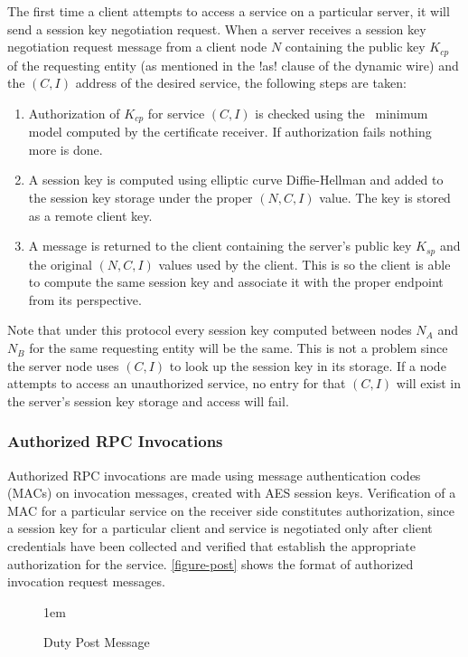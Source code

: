 The first time a client attempts to access a service on a particular server, it will send a
session key negotiation request. When a server receives a session key negotiation request
message from a client node $N$ containing the public key $K_{cp}$ of the requesting entity (as
mentioned in the !as! clause of the dynamic wire) and the $(C, I)$ address of the desired
service, the following steps are taken:
\begin{enumerate}
\item Authorization of $K_{cp}$ for service $(C, I)$ is checked using the \RT\ minimum model
  computed by the certificate receiver. If authorization fails nothing more is done.
\item A session key is computed using elliptic curve Diffie-Hellman and added to the session key
  storage under the proper $(N, C, I)$ value. The key is stored as a remote client key.
\item A message is returned to the client containing the server's public key $K_{sp}$ and the
  original $(N, C, I)$ values used by the client. This is so the client is able to compute the
  same session key and associate it with the proper endpoint from its perspective.
\end{enumerate}

Note that under this protocol every session key computed between nodes $N_A$ and $N_B$ for the
same requesting entity will be the same. This is not a problem since the server node uses $(C,
I)$ to look up the session key in its storage. If a node attempts to access an unauthorized
service, no entry for that $(C, I)$ will exist in the server's session key storage and access
will fail.

\subsubsection{Authorized RPC Invocations}

Authorized RPC invocations are made using message authentication codes (MACs) on invocation
messages, created with AES session keys. Verification of a MAC for a particular service on the
receiver side constitutes authorization, since a session key for a particular client and service
is negotiated only after client credentials have been collected and verified that establish the
appropriate authorization for the service. \autoref{figure-post} shows the format of authorized
invocation request messages.

\begin{figure}[t]
  
  \centerline{\raise 1em\box\graph}
  \caption{Duty Post Message}
  \label{figure-post}
\end{figure}

